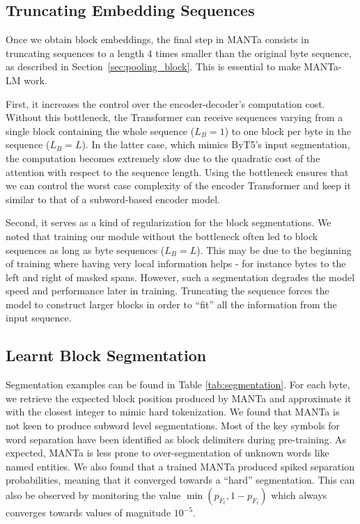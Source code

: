 \subsection{Truncating Embedding Sequences}
\label{sec:truncation}
Once we obtain block embeddings, the final step in MANTa consists in truncating sequences to a length 4 times smaller than the original byte sequence, as described in Section~\ref{sec:pooling_block}. This is essential to make MANTa-LM work.

First, it increases the control over the encoder-decoder's computation cost. Without this bottleneck, the Transformer can receive sequences varying from a single block containing the whole sequence ($L_B=1$) to one block per byte in the sequence ($L_B = L$). In the latter case, which mimics ByT5's input segmentation, the computation becomes extremely slow due to the quadratic cost  of the attention with respect to the sequence length. Using the bottleneck ensures that we can control the worst case complexity of the encoder Transformer and keep it similar to that of a subword-based encoder model.

Second, it serves as a kind of regularization for the block segmentations. We noted that training our module without the bottleneck often led to block sequences as long as byte sequences ($L_B=L$). This may be due to the beginning of training where having very local information helps - for instance bytes to the left and right of masked spans. However, such a segmentation degrades the model speed and performance later in training. Truncating the sequence forces the model to construct larger blocks in order to ``fit'' all the information from the input sequence.

\subsection{Learnt Block Segmentation}
Segmentation examples can be found in Table \ref{tab:segmentation}. For each byte, we retrieve the expected block position produced by MANTa and approximate it with the closest integer to mimic hard tokenization. We found that MANTa is not keen to produce subword level segmentations. Most of the key symbols for word separation have been identified as block delimiters during pre-training. As expected, MANTa is less prone to over-segmentation of unknown words like named entities. We also found that a trained MANTa produced spiked separation probabilities, meaning that it converged towards a ``hard'' segmentation. This can also be observed by monitoring the value $\min(p_{F_t}, 1 - p_{F_t})$ which always converges towards values of magnitude $10^{-5}$.


